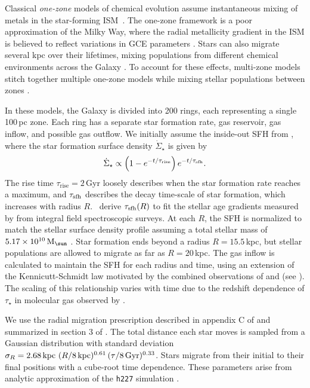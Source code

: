 \documentclass[fleqn,
usenatbib]{mnras}
\makeatletter
\newcommand{\JJ}{\citetalias{james+21}}
\newcommand{\Mo}{ {\rm M}_{\sun}}
\DeclareRobustCommand\citepos
  {\begingroup
   \let\NAT@nmfmt\NAT@posfmt%
   \NAT@swafalse\let\NAT@ctype\z@\NAT@partrue
   \@ifstar{\NAT@fulltrue\NAT@citetp}{\NAT@fullfalse\NAT@citetp}}
\let\NAT@orig@nmfmt\NAT@nmfmt
\def\NAT@posfmt#1{\NAT@orig@nmfmt{#1's}}
\makeatother
\begin{document}
Classical \textit{one-zone} models of chemical evolution assume instantaneous mixing of metals in the star-forming ISM\ \citep[e.g.,][]{matteucci21}. The one-zone framework is a poor approximation of the Milky Way, where the radial metallicity gradient in the ISM is believed to reflect variations in GCE parameters \citep[e.g.,][]{tinsley80, boissier+prantzos99, palla+20, james+24}. Stars can also migrate several kpc over their lifetimes, mixing populations from different chemical environments across the Galaxy \citep{sellwood+binney02, schonrich-binney09, bird+13, minchev+13}. To account for these effects, multi-zone models stitch together multiple one-zone models while mixing stellar populations between zones \citep[e.g.,][]{matteucci+francois1989}.


In these models, the Galaxy is divided into 200 rings, each representing a single 100\,pc zone. Each ring has a separate star formation rate, gas reservoir, gas inflow, and possible gas outflow. We initially assume the inside-out SFH from \JJ, where the star formation surface density $\dot{\Sigma}_\star$ is given by 
\begin{equation}\label{eq:inside_out}
    \dot{\Sigma}_\star \propto \left(1-e^{-t/\tau_{\rm rise}}\right) e^{-t/\tau_{\rm sfh}}.
\end{equation}
The rise time $\tau_\text{rise}=2$\,Gyr loosely describes when the star formation rate reaches a maximum, and $\tau_{\rm sfh}$ describes the decay time-scale of star formation, which increases with radius $R$. \JJ\ derive $\tau_{\rm sfh}(R)$ to fit the stellar age gradients measured by \citet{sanches20} from integral field spectroscopic surveys. At each $R$, the SFH is normalized to match the stellar surface density profile \citep[from][]{BHG16} assuming a total stellar mass of $5.17\times10^{10}\,\Mo$ \citep{LM15}. Star formation ends beyond a radius $R=15.5\,$kpc, but stellar populations are allowed to migrate as far as $R=20\,$kpc.  
The gas inflow is calculated to maintain the SFH for each radius and time, using an extension of the Kennicutt-Schmidt law \citep{kennicutt98} motivated by the combined observations of \citet{bigiel+10} and \citet{leroy+13} (see \JJ).
The scaling of this relationship varies with time due to the redshift dependence of $\tau_\star$ in molecular gas observed by \citet{tacconi18}.

We use the radial migration prescription described in appendix C of \citet{dubay+24} and summarized in section 3 of \citet{james+24}. The total distance each star moves is sampled from a Gaussian distribution with standard deviation $\sigma_R =  2.68\,{\rm kpc} \ (R/8\,{\rm kpc})^{0.61}\,(\tau / 8\,{\rm Gyr})^{0.33}$. Stars migrate from their initial to their final positions with a cube-root time dependence. 
These parameters arise from \citepos{dubay+24} analytic approximation of the {\tt h227} simulation \citep{bird+21, christensen+12, zolotov12, loebman12, BZ14}. 
\end{document}
